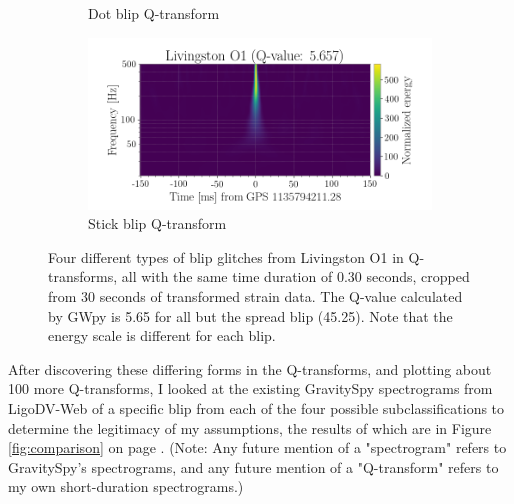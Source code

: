 \documentclass[a4paper]{article}
\begin{document}
\begin{figure}[h!]
\begin{subfigure}{.49\textwidth}
		\caption{Dot blip Q-transform}
		\label{fig:dot}
	\end{subfigure}
	\begin{subfigure}{.49\textwidth}
		\centering
		\includegraphics[width=1\linewidth]{stick_blip}
		\caption{Stick blip Q-transform}
		\label{fig:stick}
	\end{subfigure}
	\caption{Four different types of blip glitches from Livingston O1 in Q-transforms, all with the same time duration of 0.30 seconds, cropped from 30 seconds of transformed strain data. The Q-value calculated by GWpy is 5.65 for all but the spread blip (45.25). Note that the energy scale is different for each blip.}
	\label{fig:q_transforms}
\end{figure}

After discovering these differing forms in the Q-transforms, and plotting about 100 more Q-transforms, I looked at the existing GravitySpy spectrograms from LigoDV-Web of a specific blip from each of the four possible subclassifications to determine the legitimacy of my assumptions, the results of which are in Figure \ref{fig:comparison} on page \pageref{fig:comparison}. (Note: Any future mention of a "spectrogram" refers to GravitySpy's spectrograms, and any future mention of a "Q-transform" refers to my own short-duration spectrograms.)
\end{document}
